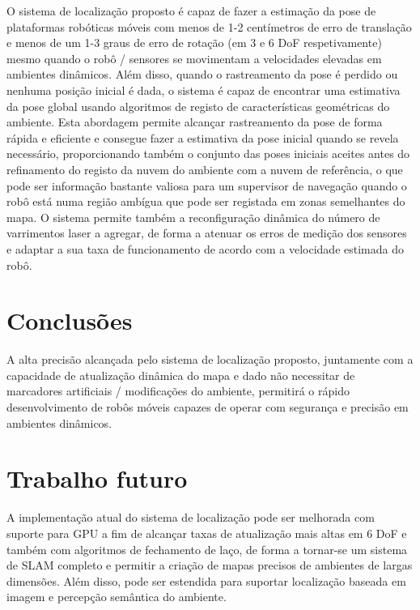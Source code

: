 \documentclass[9pt,a4paper]{extarticle}
\begin{document}
\begin{multicols}{2}
O sistema de localização proposto é capaz de fazer a estimação da pose de plataformas robóticas móveis com menos de 1-2 centímetros de erro de translação e menos de um 1-3 graus de erro de rotação (em 3 e 6 DoF respetivamente) mesmo quando o robô / sensores se movimentam a velocidades elevadas em ambientes dinâmicos. Além disso, quando o rastreamento da pose é perdido ou nenhuma posição inicial é dada, o sistema é capaz de encontrar uma estimativa da pose global usando algoritmos de registo de características geométricas do ambiente. Esta abordagem permite alcançar rastreamento da pose de forma rápida e eficiente e consegue fazer a estimativa da pose inicial quando se revela necessário, proporcionando também o conjunto das poses iniciais aceites antes do refinamento do registo da nuvem do ambiente com a nuvem de referência, o que pode ser informação bastante valiosa para um supervisor de navegação quando o robô está numa região ambígua que pode ser registada em zonas semelhantes do mapa. O sistema permite também a reconfiguração dinâmica do número de varrimentos laser a agregar, de forma a atenuar os erros de medição dos sensores e adaptar a sua taxa de funcionamento de acordo com a velocidade estimada do robô.


\section{Conclusões}

A alta precisão alcançada pelo sistema de localização proposto, juntamente com a capacidade de atualização dinâmica do mapa e dado não necessitar de marcadores artificiais / modificações do ambiente, permitirá o rápido desenvolvimento de robôs móveis capazes de operar com segurança e precisão em ambientes dinâmicos.


\section{Trabalho futuro}

A implementação atual do sistema de localização pode ser melhorada com suporte para GPU a fim de alcançar taxas de atualização mais altas em 6 DoF e também com algoritmos de fechamento de laço, de forma a tornar-se um sistema de SLAM completo e permitir a criação de mapas precisos de ambientes de largas dimensões. Além disso, pode ser estendida para suportar localização baseada em imagem e percepção semântica do ambiente.





\end{multicols}
\end{document}
